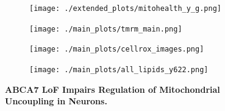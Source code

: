 \begin{figure}[H]
\begin{subfigure}[t]{.2\textwidth}
    \end{subfigure}   
    \begin{subfigure}[t]{.5\textwidth}
        \caption{}
        \texttt{[image: ./extended\_plots/mitohealth\_y\_g.png]}        
    \end{subfigure}    
    \begin{subfigure}[t]{.35\textwidth}
        \caption{}
        \texttt{[image: ./main\_plots/tmrm\_main.png]}        %
    \end{subfigure}    
    \hspace{.25cm}
    \begin{subfigure}[t]{.35\textwidth}
        \caption{}
        \texttt{[image: ./main\_plots/cellrox\_images.png]}        
    \end{subfigure}  
    \hspace{.5cm}
    \begin{subfigure}[t]{.2\textwidth}
        \caption{}
        \texttt{[image: ./main\_plots/all\_lipids\_y622.png]}        
    \end{subfigure}  
    \caption{
        \textbf{ABCA7 LoF Impairs Regulation of Mitochondrial Uncoupling in Neurons.}\\
    }
    \label{fig:main_mitochondrial}
\end{figure}
